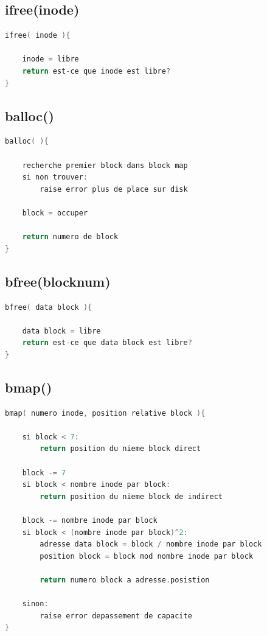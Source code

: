 \documentclass[a4paper,12pt]{article}
\begin{document}
\subsection*{ifree(inode)}

\begin{lstlisting}[language=C, caption=pseudo code ifree()()]
ifree( inode ){

	inode = libre
	return est-ce que inode est libre?
}
\end{lstlisting}

\subsection*{balloc()}

\begin{lstlisting}[language=C, caption=pseudo code balloc()()]
balloc( ){

	recherche premier block dans block map
	si non trouver:
		raise error plus de place sur disk
	
	block = occuper

	return numero de block
}
\end{lstlisting}

\subsection*{bfree(blocknum)}

\begin{lstlisting}[language=C, caption=pseudo code bfree()()]
bfree( data block ){

	data block = libre
	return est-ce que data block est libre?
}
\end{lstlisting}

\subsection*{bmap()}

\begin{lstlisting}[language=C, caption=pseudo code bmap()()]
bmap( numero inode, position relative block ){

	si block < 7:
		return position du nieme block direct
		
	block -= 7
	si block < nombre inode par block:
		return position du nieme block de indirect
	
	block -= nombre inode par block
	si block < (nombre inode par block)^2:
		adresse	data block = block / nombre inode par block
		position block = block mod nombre inode par block
		
		return numero block a adresse.posistion
		
	sinon:
		raise error depassement de capacite
}
\end{lstlisting}
\end{document}
